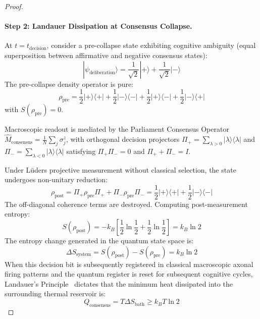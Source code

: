 \documentclass[10pt,twocolumn,3p]{article}
\begin{document}
\begin{proof}
\paragraph{Step 2: Landauer Dissipation at Consensus Collapse.}
At $t = t_{\text{decision}}$, consider a pre-collapse state exhibiting cognitive ambiguity (equal superposition between affirmative and negative consensus states):
\begin{equation}
    |\psi_{\text{deliberation}}\rangle = \frac{1}{\sqrt{2}} |+\rangle + \frac{1}{\sqrt{2}} |-\rangle
\end{equation}
The pre-collapse density operator is pure:
\begin{equation}
    \rho_{\text{pre}} = \frac{1}{2}|+\rangle \langle +| + \frac{1}{2}|-\rangle \langle -| + \frac{1}{2}|+\rangle \langle -| + \frac{1}{2}|-\rangle \langle +|
\end{equation}
with $S(\rho_{\text{pre}}) = 0$.

Macroscopic readout is mediated by the Parliament Consensus Operator $\hat{M}_{\text{consensus}} = \frac{1}{N}\sum_j \sigma_j^z$, with orthogonal decision projectors $\Pi_+ = \sum_{\lambda > 0} |\lambda\rangle \langle \lambda|$ and $\Pi_- = \sum_{\lambda < 0} |\lambda\rangle \langle \lambda|$ satisfying $\Pi_+ \Pi_- = 0$ and $\Pi_+ + \Pi_- = I$.

Under L\"uders projective measurement without classical selection, the state undergoes non-unitary reduction:
\begin{equation}
    \rho_{\text{post}} = \Pi_+ \rho_{\text{pre}} \Pi_+ + \Pi_- \rho_{\text{pre}} \Pi_- = \frac{1}{2}|+\rangle \langle +| + \frac{1}{2}|-\rangle \langle -|
\end{equation}
The off-diagonal coherence terms are destroyed. Computing post-measurement entropy:
\begin{equation}
    S(\rho_{\text{post}}) = -k_B \left[ \frac{1}{2}\ln\frac{1}{2} + \frac{1}{2}\ln\frac{1}{2} \right] = k_B \ln 2
\end{equation}
The entropy change generated in the quantum state space is:
\begin{equation}
    \Delta S_{\text{system}} = S(\rho_{\text{post}}) - S(\rho_{\text{pre}}) = k_B \ln 2
\end{equation}
When this decision bit is subsequently registered in classical macroscopic axonal firing patterns and the quantum register is reset for subsequent cognitive cycles, Landauer's Principle~\cite{landauer1961,sagawa2008} dictates that the minimum heat dissipated into the surrounding thermal reservoir is:
\begin{equation}
    \boxed{Q_{\text{consensus}} = T \Delta S_{\text{bath}} \ge k_B T \ln 2}
\end{equation}


\end{proof}
\end{document}
